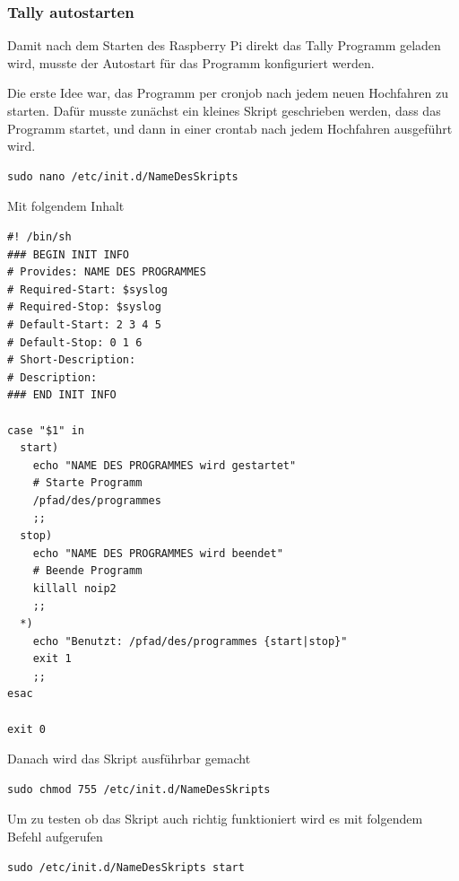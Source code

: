 \documentclass[11pt,a4paper]{article} %
\begin{document}
\subsubsection{Tally autostarten}
Damit nach dem Starten des Raspberry Pi direkt das Tally Programm geladen wird, musste der Autostart für das Programm konfiguriert werden.
\par
Die erste Idee war, das Programm per cronjob nach jedem neuen Hochfahren zu starten. Dafür musste zunächst ein kleines Skript geschrieben werden, dass das Programm startet, und dann in einer crontab nach jedem Hochfahren ausgeführt wird.
\begin{frame}

\begin{lstlisting}
sudo nano /etc/init.d/NameDesSkripts
\end{lstlisting}
\end{frame}
\newpage
Mit folgendem Inhalt
\begin{frame}

\begin{lstlisting}
#! /bin/sh
### BEGIN INIT INFO
# Provides: NAME DES PROGRAMMES
# Required-Start: $syslog
# Required-Stop: $syslog
# Default-Start: 2 3 4 5
# Default-Stop: 0 1 6
# Short-Description:
# Description:
### END INIT INFO
 
case "$1" in
  start)
    echo "NAME DES PROGRAMMES wird gestartet"
    # Starte Programm
    /pfad/des/programmes
    ;;
  stop)
    echo "NAME DES PROGRAMMES wird beendet"
    # Beende Programm
    killall noip2
    ;;
  *)
    echo "Benutzt: /pfad/des/programmes {start|stop}"
    exit 1
    ;;
esac
 
exit 0
\end{lstlisting}
\end{frame}

Danach wird das Skript ausführbar gemacht
\begin{frame}

\begin{lstlisting}
sudo chmod 755 /etc/init.d/NameDesSkripts
\end{lstlisting}
\end{frame}
Um zu testen ob das Skript auch richtig funktioniert wird es mit folgendem Befehl aufgerufen
\begin{frame}

\begin{lstlisting}
sudo /etc/init.d/NameDesSkripts start
\end{lstlisting}
\end{frame}
\end{document}
